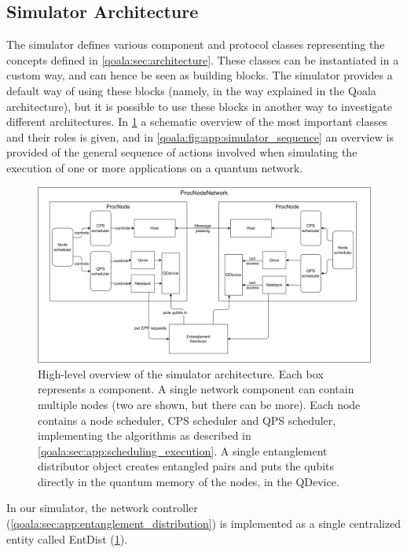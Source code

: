 \subsection{Simulator Architecture}
The simulator defines various component and protocol classes representing the concepts defined in \cref{qoala:sec:architecture}. These classes can be instantiated in a custom way, and can hence be seen as building blocks. The simulator provides a default way of using these blocks (namely, in the way explained in the Qoala architecture), but it is possible to use these blocks in another way to investigate different architectures.
In \cref{qoala:fig:app:simulator} a schematic overview of the most important classes and their roles is given, and in \cref{qoala:fig:app:simulator_sequence} an overview is provided of the general sequence of actions involved when simulating the execution of one or more applications on a quantum network.


\begin{figure}[hp]
    \centering
    \includegraphics[width=\textwidth]{figures/qoala/simulator.png}
    \caption{High-level overview of the simulator architecture. Each box represents a component.
    A single network component can contain multiple nodes (two are shown, but there can be more).
    Each node contains a node scheduler, CPS scheduler and QPS scheduler, implementing the algorithms as described in \cref{qoala:sec:app:scheduling_execution}.
    A single entanglement distributor object creates entangled pairs and puts the qubits directly in the quantum memory of the nodes, in the QDevice.
    }
    \label{qoala:fig:app:simulator}
\end{figure}

In our simulator, the network controller (\cref{qoala:sec:app:entanglement_distribution})
is implemented as a single centralized entity called EntDist (\cref{qoala:fig:app:simulator}).

